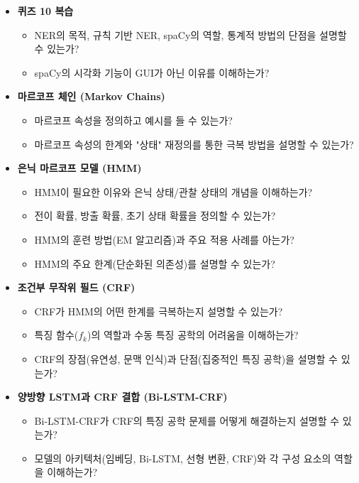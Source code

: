 \documentclass[11pt,a4paper]{article}
\begin{document}
\begin{tcolorbox}[summarybox, title=학습 점검 체크리스트]
\begin{itemize}
    \item \textbf{퀴즈 10 복습}
    \begin{itemize}
        \item NER의 목적, 규칙 기반 NER, spaCy의 역할, 통계적 방법의 단점을 설명할 수 있는가?
        \item spaCy의 시각화 기능이 GUI가 아닌 이유를 이해하는가?
    \end{itemize}
    \item \textbf{마르코프 체인 (Markov Chains)}
    \begin{itemize}
        \item 마르코프 속성을 정의하고 예시를 들 수 있는가?
        \item 마르코프 속성의 한계와 "상태" 재정의를 통한 극복 방법을 설명할 수 있는가?
    \end{itemize}
    \item \textbf{은닉 마르코프 모델 (HMM)}
    \begin{itemize}
        \item HMM이 필요한 이유와 은닉 상태/관찰 상태의 개념을 이해하는가?
        \item 전이 확률, 방출 확률, 초기 상태 확률을 정의할 수 있는가?
        \item HMM의 훈련 방법(EM 알고리즘)과 주요 적용 사례를 아는가?
        \item HMM의 주요 한계(단순화된 의존성)를 설명할 수 있는가?
    \end{itemize}
    \item \textbf{조건부 무작위 필드 (CRF)}
    \begin{itemize}
        \item CRF가 HMM의 어떤 한계를 극복하는지 설명할 수 있는가?
        \item 특징 함수($f_k$)의 역할과 수동 특징 공학의 어려움을 이해하는가?
        \item CRF의 장점(유연성, 문맥 인식)과 단점(집중적인 특징 공학)을 설명할 수 있는가?
    \end{itemize}
    \item \textbf{양방향 LSTM과 CRF 결합 (Bi-LSTM-CRF)}
    \begin{itemize}
        \item Bi-LSTM-CRF가 CRF의 특징 공학 문제를 어떻게 해결하는지 설명할 수 있는가?
        \item 모델의 아키텍처(임베딩, Bi-LSTM, 선형 변환, CRF)와 각 구성 요소의 역할을 이해하는가?

\end{itemize}
\end{itemize}
\end{tcolorbox}
\end{document}
